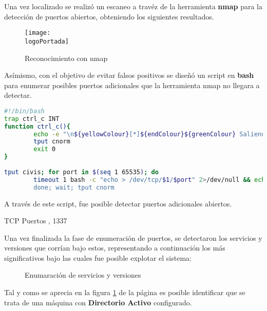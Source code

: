 \documentclass[a4paper]{article}
\newcommand{\logoPortada}{REPORTS/parrot.jpg}
\begin{document}
    \vspace{0.2cm}

    Una vez localizado se realizó un escaneo a travéz de la herramienta \textbf{nmap} para la detección de puertos abiertos, obteniendo los siguientes resultados.
    
    \begin{figure}[h]
        \centering
        \texttt{[image: \\logoPortada]}
        \caption{Reconocimiento con nmap}
    \end{figure}
    
    \clearpage
    
    Asímismo, con el objetivo de evitar falsos positivos se diseñó un script en  \textbf{bash} para enumerar posibles puertos adicionales que la herramienta nmap no llegara a detectar.
    
    \vspace{0.2cm}
    
    \begin{lstlisting}[language=Bash, caption= Script personalizado para la enumeracion de puertos]
#!/bin/bash
trap ctrl_c INT
function ctrl_c(){
        echo -e "\n${yellowColour}[*]${endColour}${greenColour} Saliendo .. ${endColour}"
        tput cnorm
        exit 0
}
    
tput civis; for port in $(seq 1 65535); do
        timeout 1 bash -c "echo > /dev/tcp/$1/$port" 2>/dev/null && echo Port $port - OPEN" &
        done; wait; tput cnorm
    \end{lstlisting}
    
    \vspace{0.3cm}
    
    A través de este script, fue posible detectar puertos adicionales abiertos.
    
    \begin{schema}{TCP}
    Puertos
    , 1337
    \end{schema}
    
    Una vez finalizada la fase de enumeración de puertos, se detectaron los servicios y versiones que corrían bajo estos, representando a continuación los más significativos bajo las cuales fue posible explotar el sistema:
    
    \begin{figure}[h]
        \centering
        \caption{Enumaración de servicios y versiones}
        \label{fig:servicesResults}
    \end{figure}
    
    \vspace{0.2cm}
    
    Tal y como se aprecia en la figura \ref{fig:servicesResults} de la página \pageref{fig:servicesResults} es posible identificar que se trata de una máquina con \textbf{Directorio Activo} configurado.
    
    
    
    
\end{document}
